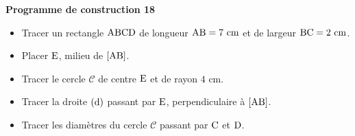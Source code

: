 \documentclass[exercice,a4]{thedocument}%
\begin{document}
%
\noindent\textbf{Programme de construction 18}\par\smallskip\noindent
\begin{itemize}
    \item Tracer un rectangle $\text{ABCD}$ de longueur
    $\text{AB}=7\text{ cm}$ et de largeur $\text{BC}=2\text{ cm}$.
    \item Placer $\text{E}$, milieu de $[\text{AB}]$.
    \item Tracer le cercle $\mathcal{C}$ de centre $\text{E}$ et de
    rayon $4\text{ cm}$.
    \item Tracer la droite $(\text{d})$ passant par
    $\text{E}$, perpendiculaire à $[\text{AB}]$.
    \item Tracer les diamètres du cercle $\mathcal{C}$ passant par
    $\text{C}$ et $\text{D}$.
\end{itemize}
\end{document}

